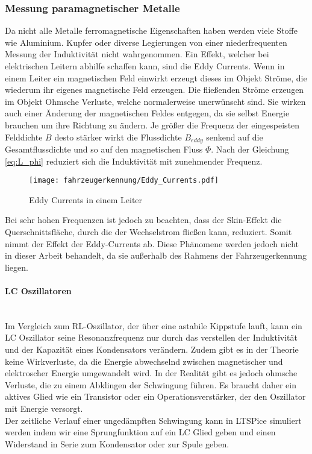 \pagebreak
\subsubsection{Messung paramagnetischer Metalle}
Da nicht alle Metalle ferromagnetische Eigenschaften haben werden viele Stoffe wie Aluminium. Kupfer oder diverse Legierungen
von einer niederfrequenten Messung der Induktivität nicht wahrgenommen. Ein Effekt, welcher bei elektrischen Leitern abhilfe schaffen kann, sind 
die Eddy Currents. Wenn in einem Leiter ein magnetischen Feld einwirkt erzeugt dieses im Objekt Ströme, die wiederum ihr eigenes magnetische Feld erzeugen.
Die fließenden Ströme erzeugen im Objekt Ohmsche Verluste, welche normalerweise unerwünscht sind. Sie wirken auch einer Änderung der magnetischen Feldes entgegen,
da sie selbst Energie brauchen um ihre Richtung zu ändern. Je größer die Frequenz der eingespeisten Felddichte $B$ desto stärker wirkt die 
Flussdichte $B_{eddy}$ senkend auf die Gesamtflussdichte und so auf den magnetischen Fluss $\Phi$. 
Nach der Gleichung \ref{eq:L_phi} reduziert sich die Induktivität mit zunehmender Frequenz.


\begin{figure}[H]
    \centering
    \texttt{[image: fahrzeugerkennung/Eddy\_Currents.pdf]}
    \caption{Eddy Currents in einem Leiter}
\end{figure}

Bei sehr hohen Frequenzen ist jedoch zu beachten, dass der Skin-Effekt die Querschnittsfläche, durch die der Wechselstrom fließen kann,
reduziert. Somit nimmt der Effekt der Eddy-Currents ab. Diese Phänomene werden jedoch nicht in dieser Arbeit behandelt, da sie außerhalb des Rahmens der 
Fahrzeugerkennung liegen. 

\paragraph{LC Oszillatoren}\mbox{}\\

Im Vergleich zum RL-Oszillator, der über eine astabile Kippstufe lauft, kann ein LC Oszillator seine Resonanzfrequenz nur durch das verstellen der Induktivität und der Kapazität 
eines Kondensators verändern. Zudem gibt es in der Theorie keine Wirkverluste, da die Energie abwechselnd zwischen magnetischer und elektroscher Energie umgewandelt wird. In der Realität gibt es jedoch
ohmsche Verluste, die zu einem Abklingen der Schwingung führen. Es braucht daher ein aktives Glied wie ein Transistor oder ein Operationsverstärker, der den Oszillator mit Energie versorgt.
\\
Der zeitliche Verlauf einer ungedämpften Schwingung kann in LTSPice simuliert werden indem wir eine Sprungfunktion auf ein LC Glied geben und einen Widerstand in Serie zum Kondensator oder zur
Spule geben.


